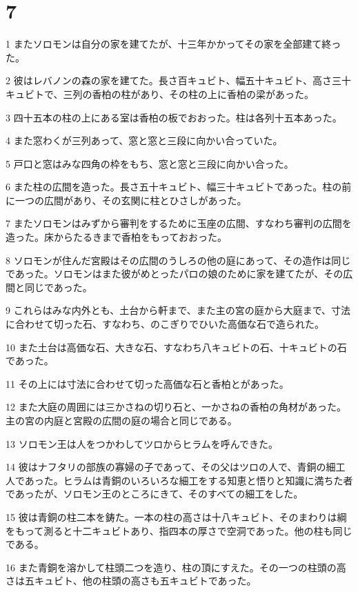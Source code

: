\chapter{7}

\par 1 またソロモンは自分の家を建てたが、十三年かかってその家を全部建て終った。
\par 2 彼はレバノンの森の家を建てた。長さ百キュビト、幅五十キュビト、高さ三十キュビトで、三列の香柏の柱があり、その柱の上に香柏の梁があった。
\par 3 四十五本の柱の上にある室は香柏の板でおおった。柱は各列十五本あった。
\par 4 また窓わくが三列あって、窓と窓と三段に向かい合っていた。
\par 5 戸口と窓はみな四角の枠をもち、窓と窓と三段に向かい合った。
\par 6 また柱の広間を造った。長さ五十キュビト、幅三十キュビトであった。柱の前に一つの広間があり、その玄関に柱とひさしがあった。
\par 7 またソロモンはみずから審判をするために玉座の広間、すなわち審判の広間を造った。床からたるきまで香柏をもっておおった。
\par 8 ソロモンが住んだ宮殿はその広間のうしろの他の庭にあって、その造作は同じであった。ソロモンはまた彼がめとったパロの娘のために家を建てたが、その広間と同じであった。
\par 9 これらはみな内外とも、土台から軒まで、また主の宮の庭から大庭まで、寸法に合わせて切った石、すなわち、のこぎりでひいた高価な石で造られた。
\par 10 また土台は高価な石、大きな石、すなわち八キュビトの石、十キュビトの石であった。
\par 11 その上には寸法に合わせて切った高価な石と香柏とがあった。
\par 12 また大庭の周囲には三かさねの切り石と、一かさねの香柏の角材があった。主の宮の内庭と宮殿の広間の庭の場合と同じである。
\par 13 ソロモン王は人をつかわしてツロからヒラムを呼んできた。
\par 14 彼はナフタリの部族の寡婦の子であって、その父はツロの人で、青銅の細工人であった。ヒラムは青銅のいろいろな細工をする知恵と悟りと知識に満ちた者であったが、ソロモン王のところにきて、そのすべての細工をした。
\par 15 彼は青銅の柱二本を鋳た。一本の柱の高さは十八キュビト、そのまわりは綱をもって測ると十二キュビトあり、指四本の厚さで空洞であった。他の柱も同じである。
\par 16 また青銅を溶かして柱頭二つを造り、柱の頂にすえた。その一つの柱頭の高さは五キュビト、他の柱頭の高さも五キュビトであった。
